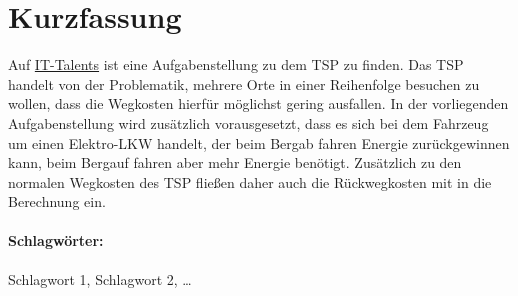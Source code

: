 \section*{Kurzfassung}\thispagestyle{empty}
    \label{chap:kurzfassung}

    Auf \href{https://www.it-talents.de/foerderung/code-competition/code-competition-04-2018}{IT-Talents} ist eine Aufgabenstellung zu dem \acf{TSP} zu finden. Das \acl{TSP} handelt von der Problematik, mehrere Orte in einer Reihenfolge besuchen zu wollen, dass die Wegkosten hierfür möglichst gering ausfallen. In der vorliegenden Aufgabenstellung wird zusätzlich vorausgesetzt, dass es sich bei dem Fahrzeug um einen Elektro-LKW handelt, der beim Bergab fahren Energie zurückgewinnen kann, beim Bergauf fahren aber mehr Energie benötigt. Zusätzlich zu den normalen Wegkosten des \acl{TSP} fließen daher auch die Rückwegkosten mit in die Berechnung ein.
    
    \vfill
\paragraph*{Schlagwörter:} Schlagwort 1, Schlagwort 2, \dots
